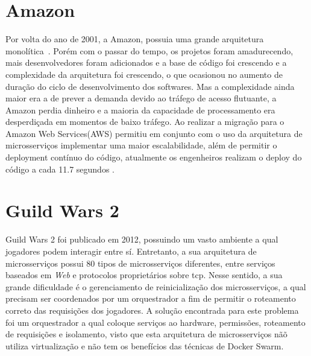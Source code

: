 \section{Amazon}
Por volta do ano de 2001, a Amazon, possuia uma grande arquitetura monolítica~\cite{microservicesAmazon1}. Porém com o passar do tempo, os projetos foram amadurecendo, mais desenvolvedores foram adicionados e a base de código foi crescendo e a complexidade da arquitetura foi crescendo, o que ocasionou no aumento de duração do ciclo de desenvolvimento dos softwares.
Mas a complexidade ainda maior era a de prever a demanda devido ao tráfego de acesso flutuante, a Amazon perdia dinheiro e a maioria da capacidade de processamento era desperdiçada em momentos de baixo tráfego. Ao realizar a migração para o Amazon Web Services(AWS) permitiu em conjunto com o uso da arquitetura de microsserviços implementar uma maior escalabilidade, além de permitir o deployment contínuo do código, atualmente os engenheiros realizam o deploy do código a cada 11.7 segundos \cite{microservicesAmazon2}.

\section{Guild Wars 2}
Guild Wars 2 foi publicado em 2012, possuindo um vasto ambiente a qual jogadores podem interagir entre sí.
%
Entretanto, a sua arquitetura de microsserviços possui 80 tipos de microsserviços diferentes, entre serviços baseados em \textit{Web} e protocolos proprietários sobre \ac{tcp}.
%
Nesse sentido, a sua grande dificuldade é o gerenciamento de reinicialização dos microsserviços, a qual precisam ser coordenados por um orquestrador a fim de permitir o roteamento correto das requisições dos jogadores.
%
A solução encontrada para este problema foi um orquestrador a qual coloque serviços ao hardware, permissões, roteamento de requisições e isolamento, visto que esta arquitetura de microsserviços nãõ utiliza virtualização e não tem os benefícios das técnicas de Docker Swarm.
